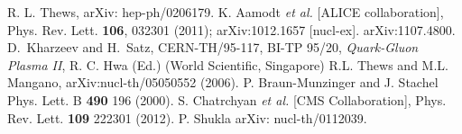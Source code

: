 \documentclass[aps,prc,preprint,superscriptaddress,showpacs,showkeys]{revtex4-1}
\begin{document}
\begin{thebibliography}{100}
               R. L. Thews, arXiv: hep-ph/0206179.
 K. Aamodt {\it et al.} [ALICE collaboration], Phys. Rev. Lett. {\bf 106}, 032301 (2011);
          arXiv:1012.1657 [nucl-ex].
       arXiv:1107.4800.  
D.~Kharzeev and H.~Satz, CERN-TH/95-117, BI-TP 95/20,
         {\it Quark-Gluon Plasma II}, R. C. Hwa (Ed.) (World Scientific, Singapore)
 R.L. Thews and M.L. Mangano, arXiv:nucl-th/05050552 (2006).
 P. Braun-Munzinger and J. Stachel Phys. Lett. B {\bf 490} 196 (2000).
 S. Chatrchyan {\it et al.} [CMS Collaboration], Phys. Rev. Lett. {\bf 109} 222301 (2012). 
 P. Shukla arXiv: nucl-th/0112039. 
\end{thebibliography}
\end{document}
